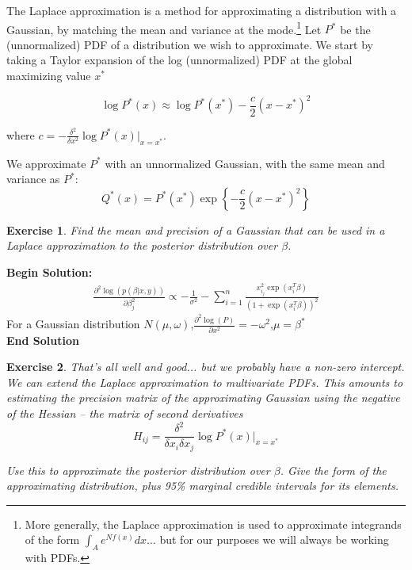\documentclass[twoside]{article}
\newcounter{lecnum}
\newtheorem{exercise}{Exercise}[lecnum]
\begin{document}
The Laplace approximation is a method for approximating a distribution with a Gaussian, by matching the mean and variance at the mode.\footnote{More generally, the Laplace approximation is used to approximate integrands of the form $\int_A e^{Nf(x)} dx$... but for our purposes we will always be working with PDFs.} Let $P^*$ be the (unnormalized) PDF  of a distribution we wish to approximate. We start by taking a Taylor expansion of the log (unnormalized) PDF at the global maximizing value $x^*$

$$\log P^*(x) \approx \log P^*(x^*) - \frac{c}{2}(x-x^*)^2$$

where $c = -\frac{\delta^2}{\delta x^2}\log P^*(x)\Big\rvert_{x=x^*}$.

We approximate $P^*$ with an unnormalized Gaussian, with the same mean and variance as $P^*$:
$$Q^*(x) = P^*(x^*)\exp\left\{-\frac{c}{2}(x-x^*)^2\right\}$$




\begin{exercise}
  Find the mean and precision of a Gaussian that can be used in a Laplace approximation to the posterior distribution over $\beta$.
\end{exercise}

\textbf{Begin Solution:}
\begin{equation*}
\begin{split}
\frac{\partial^2 \log \left(p(\beta|x,y) \right)}{\partial \beta_j^2} \propto -\frac{1}{\sigma^2} - \sum_{i = 1}^n \frac{x_{i_j}^2 \exp\left(x_i^T\beta\right)}{\left(1+\exp\left(x_i^T\beta\right)\right)^2}
\end{split}
\end{equation*}
For a Gaussian distribution $N\left( \mu,\omega\right)$,$\frac{\partial^2 \log (P)}{\partial x^2} = -\omega^2$,$\mu = \beta^*$\\
\textbf{End Solution}

\begin{exercise}
  That's all well and good... but we probably have a non-zero intercept.  We can extend the Laplace approximation to multivariate PDFs. This amounts to estimating the precision matrix of the approximating Gaussian using the negative of the Hessian -- the matrix of second derivatives
$$H_{ij} = \frac{\delta^2}{\delta x_i \delta x_j}\log P^*(x)\Big\rvert_{x=x^*}$$

  Use this to approximate the posterior distribution over $\beta$. Give the form of the approximating distribution, plus 95\% marginal credible intervals for its elements.
\end{exercise}
\end{document}
